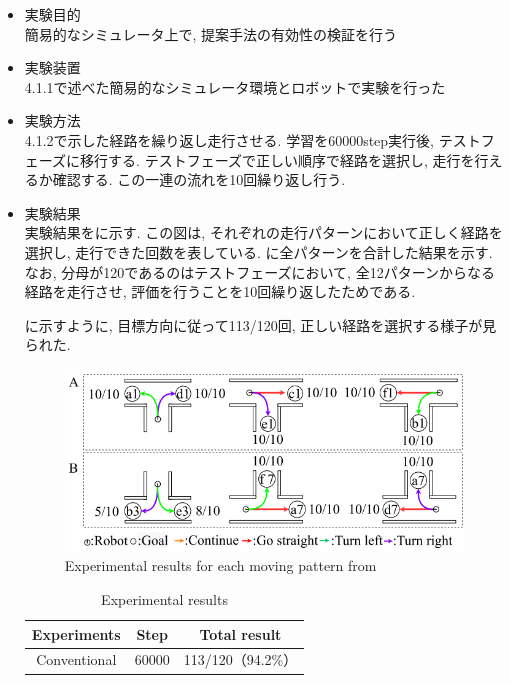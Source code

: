 \begin{itemize}
  \item 実験目的\\
  簡易的なシミュレータ上で, 提案手法の有効性の検証を行う
  \item 実験装置\\
  4.1.1で述べた簡易的なシミュレータ環境とロボットで実験を行った
  \item 実験方法\\
  4.1.2で示した経路を繰り返し走行させる. 学習を60000step実行後, テストフェーズに移行する. テストフェーズで正しい順序で経路を選択し, 走行を行えるか確認する. この一連の流れを10回繰り返し行う.

  \newpage

  \item 実験結果\\
  実験結果をに示す. この図は, それぞれの走行パターンにおいて正しく経路を選択し, 走行できた回数を表している. に全パターンを合計した結果を示す. なお, 分母が120であるのはテストフェーズにおいて, 全12パターンからなる経路を走行させ, 評価を行うことを10回繰り返したためである. 
  \par
  に示すように, 目標方向に従って113/120回, 正しい経路を選択する様子が見られた. 

\vspace{1cm}

\begin{figure}[hbtp]
  \centering
 \includegraphics[keepaspectratio, scale=0.5]
      {images/60000step.png}
 \caption{Experimental results for each moving pattern from \cite{mech}}
 \label{Fig:60000step}
\end{figure}

\vspace{1cm}

\begin{table}[hbtp]
  \caption{Experimental results}
  \label{table:result}
  \centering
  \begin{tabular}{|c|c|c|}
    \hline
    Experiments & Step & Total result\\
    \hline
    Conventional & 60000 & 113/120（94.2\%）\\
    \hline
  \end{tabular}
\end{table}

\end{itemize}


